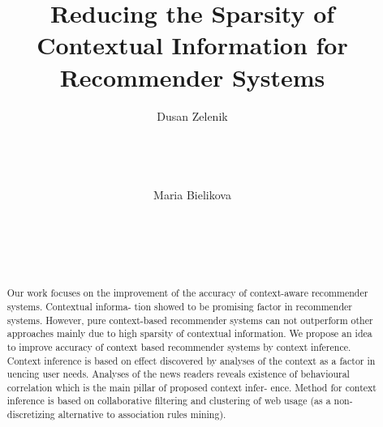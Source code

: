 \documentclass{acm_proc_article-sp}
\begin{document}

\title{Reducing the Sparsity of Contextual Information for Recommender Systems}


\author{
\alignauthor
Dusan Zelenik\\
       \\
       \\
       \\
       \\
\alignauthor
Maria Bielikova\\
       \\
       \\
       \\
       \\
}

\maketitle


\begin{abstract}
Our work focuses on the improvement of the accuracy of
context-aware recommender systems. Contextual informa-
tion showed to be promising factor in recommender systems.
However, pure context-based recommender systems can not
outperform other approaches mainly due to high sparsity
of contextual information. We propose an idea to improve
accuracy of context based recommender systems by context
inference. Context inference is based on effect discovered
by analyses of the context as a factor in
uencing user needs.
Analyses of the news readers reveals existence of behavioural
correlation which is the main pillar of proposed context infer-
ence. Method for context inference is based on collaborative
filtering and clustering of web usage (as a non-discretizing
alternative to association rules mining).
\end{abstract}

\end{document}
